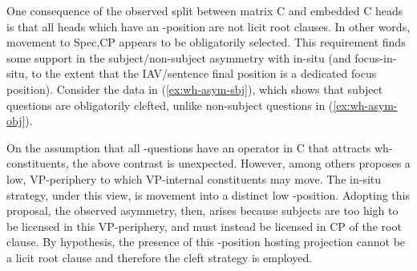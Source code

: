 \documentclass[12pt]{article}
\begin{document}
One consequence of the observed split between matrix C and embedded C heads is that all heads which have an \abar{}-position are not licit root clauses. In other words, movement to Spec,CP appears to be obligatorily selected. This requirement finds some support in the subject/non-subject asymmetry with in-situ (and focus-in-situ, to the extent that the IAV/sentence final position is a dedicated focus position). Consider the data in (\ref{ex:wh-asym-sbj}), which shows that subject questions are obligatorily clefted, unlike non-subject questions in (\ref{ex:wh-asym-obj}).

\bex
\ex {} \label{ex:wh-asym-sbj} \bxl
{}
\fxl
\ex {} \label{ex:wh-asym-obj}\bxl
{}
\fxl
\fex

On the assumption that all -questions have an operator in C that attracts wh-constituents, the above contrast is unexpected. However, \citet{ndayiragije-1999} among others proposes a low, VP-periphery to which VP-internal constituents may move. The in-situ strategy, under this view, is movement into a distinct low \abar{}-position. Adopting this proposal, the observed asymmetry, then, arises because subjects are too high to be licensed in this VP-periphery, and must instead be licensed in CP of the root clause. By hypothesis, the presence of this \abar{}-position hosting projection cannot be a licit root clause and therefore the cleft strategy is employed. 
\end{document}
